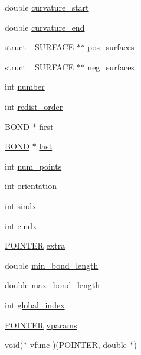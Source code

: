 \begin{DoxyCompactItemize}
double \hyperlink{struct___c_u_r_v_e_a50be129357c71fc722a35c8e87c34df6}{curvature\+\_\+start}
\item 
double \hyperlink{struct___c_u_r_v_e_a409c06261f1a39a265eacba9961c1b29}{curvature\+\_\+end}
\item 
struct \hyperlink{struct___s_u_r_f_a_c_e}{\+\_\+\+S\+U\+R\+F\+A\+CE} $\ast$$\ast$ \hyperlink{struct___c_u_r_v_e_ab018f6447781988f64737b1e669fe237}{pos\+\_\+surfaces}
\item 
struct \hyperlink{struct___s_u_r_f_a_c_e}{\+\_\+\+S\+U\+R\+F\+A\+CE} $\ast$$\ast$ \hyperlink{struct___c_u_r_v_e_a2c5eb66af09e18ede96bc34c149e845e}{neg\+\_\+surfaces}
\item 
int \hyperlink{struct___c_u_r_v_e_aac932e74b3447d92c752797c714326b5}{number}
\item 
int \hyperlink{struct___c_u_r_v_e_afc528feba44b761b3cc7977e55c1e7f5}{redist\+\_\+order}
\item 
\hyperlink{int_8h_a13b5a9ccac0e6d04386af2ef62582540}{B\+O\+ND} $\ast$ \hyperlink{struct___c_u_r_v_e_a0557ccc1cbf018b0cfe2639fe8a4fc3b}{first}
\item 
\hyperlink{int_8h_a13b5a9ccac0e6d04386af2ef62582540}{B\+O\+ND} $\ast$ \hyperlink{struct___c_u_r_v_e_a2b0812a62ecb78e7db0ac1dddeb03398}{last}
\item 
int \hyperlink{struct___c_u_r_v_e_aa7fb1a3f9f000489cbbc5ce174dbbe6b}{num\+\_\+points}
\item 
int \hyperlink{struct___c_u_r_v_e_ada56d354d3f3db6ea57fb86029d24362}{orientation}
\item 
int \hyperlink{struct___c_u_r_v_e_a40efbaf6548b826fece6e6ddd0a12eca}{sindx}
\item 
int \hyperlink{struct___c_u_r_v_e_a035b7875e9ac4b10ff1c9abff5e0a38c}{eindx}
\item 
\hyperlink{cdecs_8h_ae51a81000f343b8ec43bca1f6a723d7b}{P\+O\+I\+N\+T\+ER} \hyperlink{struct___c_u_r_v_e_a3c53388fefeb60d238c18d7c81864825}{extra}
\item 
double \hyperlink{struct___c_u_r_v_e_ac922a661dd30016ad92cf7d915b18ab7}{min\+\_\+bond\+\_\+length}
\item 
double \hyperlink{struct___c_u_r_v_e_a272f06b1e83826a4f6e5e00a210cb7ea}{max\+\_\+bond\+\_\+length}
\item 
int \hyperlink{struct___c_u_r_v_e_acb27e2410c23c09feb9653a9e6383528}{global\+\_\+index}
\item 
\hyperlink{cdecs_8h_ae51a81000f343b8ec43bca1f6a723d7b}{P\+O\+I\+N\+T\+ER} \hyperlink{struct___c_u_r_v_e_aaa3be6350d3646926fd4ad0c129c7bef}{vparams}
\item 
void($\ast$ \hyperlink{struct___c_u_r_v_e_acaa99689f99291857a4f910340e83478}{vfunc} )(\hyperlink{cdecs_8h_ae51a81000f343b8ec43bca1f6a723d7b}{P\+O\+I\+N\+T\+ER}, double $\ast$)
\end{DoxyCompactItemize}


